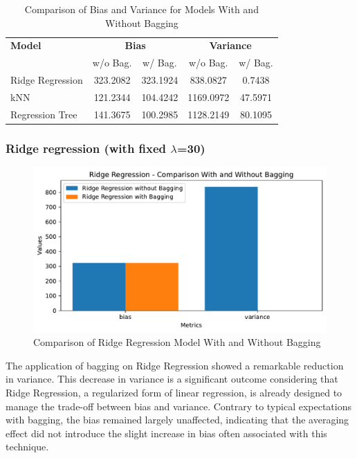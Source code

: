 \documentclass[12pt,titlepage]{article}
\begin{document}
\begin{table}[H]
    \centering
    \begin{tabular}{|l|cc|cc|}
        \hline
        \textbf{Model} & \multicolumn{2}{c|}{\textbf{Bias}} & \multicolumn{2}{c|}{\textbf{Variance}} \\
        \cline{2-5}
                       & w/o Bag. & w/ Bag. & w/o Bag. & w/ Bag. \\
        \hline
        Ridge Regression & 323.2082 & 323.1924 & 838.0827 & 0.7438 \\
        \hline
        kNN              & 121.2344 & 104.4242 & 1169.0972 & 47.5971 \\
        \hline
        Regression Tree  & 141.3675 & 100.2985 & 1128.2149 & 80.1095 \\
        \hline
    \end{tabular}
    \caption{Comparison of Bias and Variance for Models With and Without Bagging}
    \label{tab:model_comparison_bagging}
\end{table}



\subsubsection{Ridge regression (with fixed $\lambda$=30)}

\begin{figure}[H]
    \centering
    \includegraphics[scale=0.8]{image/2_5_Ridge Regression_comparison.pdf}
    \caption{Comparison of Ridge Regression Model With and Without Bagging}
    \label{fig:ridge_regression_comparison}
\end{figure}

The application of bagging on Ridge Regression showed a remarkable reduction in variance. This decrease in variance is a significant outcome considering that Ridge Regression, a regularized form of linear regression, is already designed to manage the trade-off between bias and variance. Contrary to typical expectations with bagging, the bias remained largely unaffected, indicating that the averaging effect did not introduce the slight increase in bias often associated with this technique.
\end{document}
